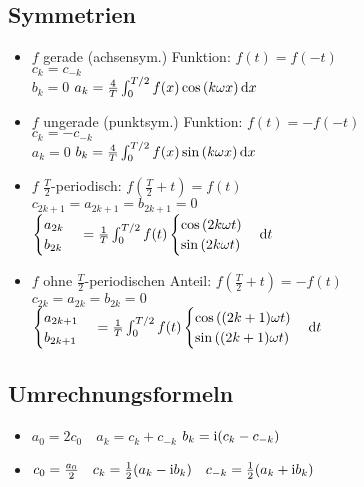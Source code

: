 \documentclass[german,color,5pt]{latex4ei/latex4ei_fs}
\begin{document}
\begin{sectionbox}
	\subsection{Symmetrien}
	\begin{itemize}
		\item $f$ gerade (achsensym.) Funktion: $f(t) = f(-t)$\\
		$c_k = c_{-k}$\\
		$b_k = 0$ \qquad $a_k = \frac{4}{T} \int_{0}^{T/2} f(x) \cos \left(k \omega x \right) \diff x$
		\item $f$ ungerade (punktsym.) Funktion: $f(t) = -f(-t)$\\
		$c_k = -c_{-k}$\\
		$a_k = 0$ \qquad $ b_k = \frac{4}{T} \int_{0}^{T/2} f(x) \sin \left(k \omega x \right) \diff x$
		\item $f$ $\frac{T}{2}$-periodisch: $f(\frac{T}{2} + t) = f(t)$\\
		$c_{2k+1} = a_{2k+1} = b_{2k+1} = 0$\\
		$\begin{cases} a_{2k}\\ b_{2k} \end{cases} = \frac{1}{T}\int_0^{T/2}f(t)\begin{cases} \cos{(2k \omega t)}\\ \sin{(2k \omega t)} \end{cases} \diff t$
		\item $f$ ohne $\frac{T}{2}$-periodischen Anteil: $f(\frac{T}{2} + t) = -f(t)$\\
		$c_{2k} = a_{2k} = b_{2k} = 0$\\
		$\begin{cases} a_{2k+1}\\ b_{2k+1} \end{cases} = \frac{1}{T}\int_0^{T/2}f(t)\begin{cases} \cos{((2k+1) \omega t)}\\ \sin{((2k+1) \omega t)} \end{cases} \diff t$
	\end{itemize}
\end{sectionbox}

\begin{sectionbox}
	\subsection{Umrechnungsformeln}
	\begin{itemize}
		\item $a_0 = 2 c_0 \quad a_k = c_k + c_{-k}$  \quad $b_k = \mathrm{i} (c_k - c_{-k})$
		\item $c_0 = \frac{a_0}{2} \quad c_k = \frac12(a_k - \mathrm{i} b_k) \quad c_{-k} = \frac12(a_k + \mathrm{i} b_k)$
	\end{itemize}
\end{sectionbox}
\end{document}
